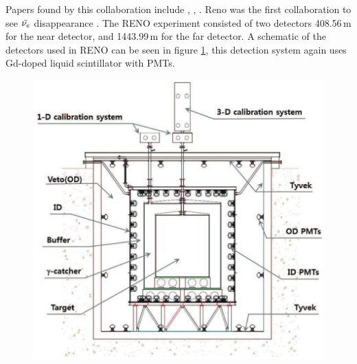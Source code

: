Papers found by this collaboration include \cite{reno_may_2012}, \cite{reno2013},  \cite{reno_may_2019}. Reno was the first collaboration to see $\Bar{\nu_e}$ disappearance \cite{Olive_2014}. The RENO experiment consisted of two detectors 408.56\,m for the near detector, and 1443.99\,m for the far detector. A schematic of the detectors used in RENO can be seen in figure \ref{RENO_detector}, this detection system again uses Gd-doped liquid scintillator with PMTs. 

\begin{figure}[!h]
 \centering
 \includegraphics[width=0.5\linewidth]{Chapter2/Figs/Raster/RENO_detector.png} %

 \label{RENO_detector}
\end{figure}


